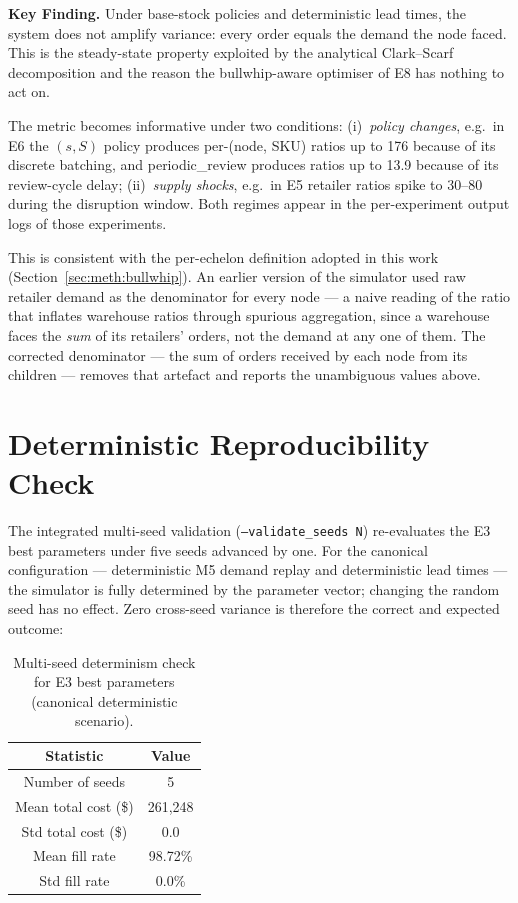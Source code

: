 \textbf{Key Finding.}  Under base-stock policies and deterministic lead
times, the system does not amplify variance: every order equals the
demand the node faced.  This is the steady-state property exploited by
the analytical Clark--Scarf decomposition and the reason the
bullwhip-aware optimiser of E8 has nothing to act on.

The metric becomes informative under two conditions: (i)~\emph{policy
changes}, e.g.\ in E6 the $(s,S)$ policy produces per-(node, SKU)
ratios up to 176 because of its discrete batching, and
periodic\_review produces ratios up to 13.9 because of its review-cycle
delay; (ii)~\emph{supply shocks}, e.g.\ in E5 retailer ratios spike to
30--80 during the disruption window.  Both regimes appear in the
per-experiment output logs of those experiments.

This is consistent with the per-echelon definition adopted in this work
(Section~\ref{sec:meth:bullwhip}).  An earlier version of the simulator
used raw retailer demand as the denominator for every node — a naive
reading of the \citet{LeeEtAl1997} ratio that inflates warehouse ratios
through spurious aggregation, since a warehouse faces the \emph{sum} of
its retailers' orders, not the demand at any one of them.  The corrected
denominator — the sum of orders received by each node from its children
— removes that artefact and reports the unambiguous values above.

\section{Deterministic Reproducibility Check}
\label{sec:results:stats}

The integrated multi-seed validation (\texttt{--validate\_seeds N})
re-evaluates the E3 best parameters under five seeds advanced by one.
For the canonical configuration — deterministic M5 demand
replay and deterministic lead times — the simulator is fully determined
by the parameter vector; changing the random seed has no effect.  Zero
cross-seed variance is therefore the correct and expected outcome:

\begin{table}[htbp]
  \centering
  \caption{Multi-seed determinism check for E3 best parameters (canonical deterministic scenario).}
  \label{tab:multiseed}
  \begin{tabular}{@{}cc@{}}
    \toprule
    Statistic & Value \\
    \midrule
    Number of seeds      & 5 \\
    Mean total cost (\$) & 261,248 \\
    Std total cost (\$)  & 0.0 \\
    Mean fill rate       & 98.72\% \\
    Std fill rate        & 0.0\% \\
    \bottomrule
  \end{tabular}
\end{table}

